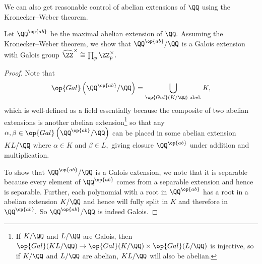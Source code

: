 We can also get reasonable control of abelian extensions of $\QQ$ using the Kronecker--Weber theorem.
\begin{exe}
	Let $\QQ^{\op{ab}}$ be the maximal abelian extension of $\QQ.$ Assuming the Kronecker--Weber theorem, we show that $\QQ^{\op{ab}}/\QQ$ is a Galois extension with Galois group $\widehat{\ZZ}^\times\cong\prod_p\ZZ_p^\times.$
\end{exe}
\begin{proof}
	Note that
	\[\op{Gal}\left(\QQ^{\op{ab}}/\QQ\right)=\bigcup_{\op{Gal}(K/\QQ)\text{ abel.}}K,\]
	which is well-defined as a field essentially because the composite of two abelian extensions is another abelian extension\footnote{If $K/\QQ$ and $L/\QQ$ are Galois, then $\op{Gal}(KL/\QQ)\to\op{Gal}(K/\QQ)\times\op{Gal}(L/\QQ)$ is injective, so if $K/\QQ$ and $L/\QQ$ are abelian, $KL/\QQ$ will also be abelian.} so that any $\alpha,\beta\in\op{Gal}\left(\QQ^{\op{ab}}/\QQ\right)$ can be placed in some abelian extension $KL/\QQ$ where $\alpha\in K$ and $\beta\in L,$ giving closure $\QQ^{\op{ab}}$ under addition and multiplication.

	To show that $\QQ^{\op{ab}}/\QQ$ is a Galois extension, we note that it is separable because every element of $\QQ^{\op{ab}}$ comes from a separable extension and hence is separable. Further, each polynomial with a root in $\QQ^{\op{ab}}$ has a root in a abelian extension $K/\QQ$ and hence will fully split in $K$ and therefore in $\QQ^{\op{ab}}.$ So $\QQ^{\op{ab}}/\QQ$ is indeed Galois.


\end{proof}
